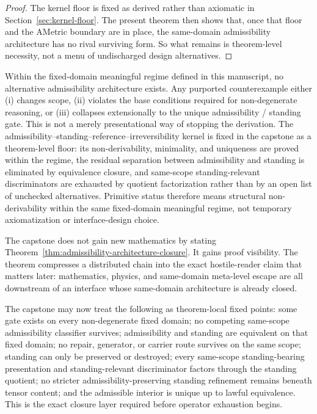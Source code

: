 \begin{proof}
The kernel floor is fixed as derived rather than axiomatic in Section~\ref{sec:kernel-floor}. The present theorem then shows that, once that floor and the AMetric boundary are in place, the same-domain admissibility architecture has no rival surviving form. So what remains is theorem-level necessity, not a menu of undischarged design alternatives.
\end{proof}

\begin{remark}
Within the fixed-domain meaningful regime defined in this manuscript, no alternative admissibility architecture exists. Any purported counterexample either (i) changes scope, (ii) violates the base conditions required for non-degenerate reasoning, or (iii) collapses extensionally to the unique admissibility / standing gate. This is not a merely presentational way of stopping the derivation. The admissibility--standing--reference--irreversibility kernel is fixed in the capstone as a theorem-level floor: its non-derivability, minimality, and uniqueness are proved within the regime, the residual separation between admissibility and standing is eliminated by equivalence closure, and same-scope standing-relevant discriminators are exhausted by quotient factorization rather than by an open list of unchecked alternatives. Primitive status therefore means structural non-derivability within the same fixed-domain meaningful regime, not temporary axiomatization or interface-design choice.
\end{remark}

\begin{remark}
The capstone does not gain new mathematics by stating Theorem~\ref{thm:admissibility-architecture-closure}. It gains proof visibility. The theorem compresses a distributed chain into the exact hostile-reader claim that matters later: mathematics, physics, and same-domain meta-level escape are all downstream of an interface whose same-domain architecture is already closed.
\end{remark}

\begin{remark}
The capstone may now treat the following as theorem-local fixed points: some gate exists on every non-degenerate fixed domain; no competing same-scope admissibility classifier survives; admissibility and standing are equivalent on that fixed domain; no repair, generator, or carrier route survives on the same scope; standing can only be preserved or destroyed; every same-scope standing-bearing presentation and standing-relevant discriminator factors through the standing quotient; no stricter admissibility-preserving standing refinement remains beneath tensor content; and the admissible interior is unique up to lawful equivalence. This is the exact closure layer required before operator exhaustion begins.
\end{remark}

